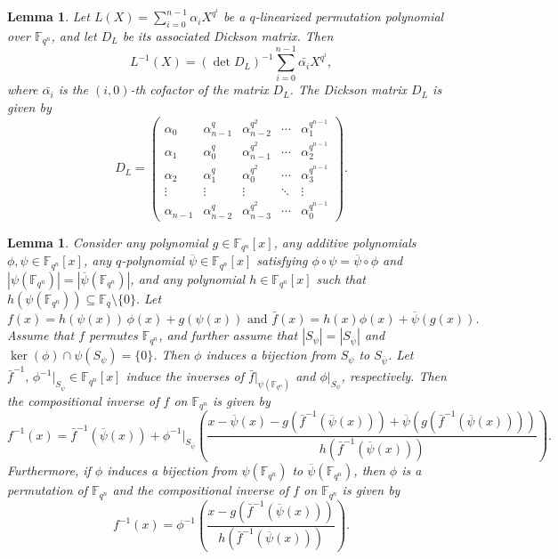 \documentclass[12pt]{amsart}
\newtheorem{lemma}[theorem]{Lemma}
\theoremstyle{definition}
\theoremstyle{remark}
\numberwithin{equation}{section}
\begin{document}
\begin{lemma}\cite{j1}\label{l2.6}
Let $L(X) = \sum_{i=0}^{n-1} \alpha_i X^{q^i}$ be a $q$-linearized permutation polynomial over $\mathbb{F}_{q^n}$, and let $D_L$ be its associated Dickson matrix. Then
$$
L^{-1}(X) = (\det D_L)^{-1} \sum_{i=0}^{n-1} \bar{\alpha_i} X^{q^i},
$$
where $\bar{\alpha_i}$ is the $(i,0)$-th cofactor of the matrix $D_L$. The Dickson matrix $D_L$ is given by
$$
D_L =
\begin{pmatrix}
\alpha_0 & \alpha_{n-1}^q & \alpha_{n-2}^{q^2} & \cdots & \alpha_1^{q^{n-1}} \\
\alpha_1 & \alpha_0^q     & \alpha_{n-1}^{q^2} & \cdots & \alpha_2^{q^{n-1}} \\
\alpha_2 & \alpha_1^q     & \alpha_0^{q^2}     & \cdots & \alpha_3^{q^{n-1}} \\
\vdots   & \vdots         & \vdots             & \ddots & \vdots \\
\alpha_{n-1} & \alpha_{n-2}^q & \alpha_{n-3}^{q^2} & \cdots & \alpha_0^{q^{n-1}}
\end{pmatrix}.
$$
\end{lemma}

\begin{lemma}\cite{j2}\label{l2.7}
Consider any polynomial $g \in \mathbb{F}_{q^n}[x]$, any additive polynomials $\phi,\psi \in \mathbb{F}_{q^n}[x]$, any $q$-polynomial $\overline{\psi} \in \mathbb{F}_{q^n}[x]$ satisfying $\phi \circ \psi = \overline{\psi} \circ \phi
$ and $|\psi(\mathbb{F}_{q^n})| = |\overline{\psi}(\mathbb{F}_{q^n})|$, and any polynomial $h \in \mathbb{F}_{q^n}[x]$ such that
$
h(\psi(\mathbb{F}_{q^n})) \subseteq \mathbb{F}_q \setminus \{0\}.
$
Let
$
f(x) = h(\psi(x))\,\phi(x) + g(\psi(x)) \text{ and } 
\bar{f}(x) = h(x)\phi(x) + \overline{\psi}(g(x)).
$ Assume that $f$ permutes $\mathbb{F}_{q^n}$, and further assume that $|S_{\psi}| = |S_{\overline{\psi}}|$ and
$\ker(\phi) \cap \psi(S_{\psi}) = \{0\}$. Then $\phi$ induces a bijection from $S_{\psi}$ to $S_{\overline{\psi}}$. Let $\bar{f}^{-1},\, \phi^{-1}\!\big|_{S_{\overline{\psi}}} \in \mathbb{F}_{q^n}[x]$ induce the inverses of $\bar{f}\!\big|_{\psi(\mathbb{F}_{q^n})}$ and $\phi\!\big|_{S_{\psi}}$, respectively. Then the compositional inverse of $f$ on $\mathbb{F}_{q^n}$ is given by
$$
f^{-1}(x)
=
\bar{f}^{-1}(\overline{\psi}(x))
+
\phi^{-1}\!\big|_{S_{\overline{\psi}}}
\left(
\frac{
x - \overline{\psi}(x) - g(\bar{f}^{-1}(\overline{\psi}(x))) + \overline{\psi}(g(\bar{f}^{-1}(\overline{\psi}(x))))
}
{h(\bar{f}^{-1}(\overline{\psi}(x)))}
\right).
$$
Furthermore, if $\phi$ induces a bijection from $\psi(\mathbb{F}_{q^n})$ to $\overline{\psi}(\mathbb{F}_{q^n})$, then $\phi$ is a permutation of $\mathbb{F}_{q^n}$ and the compositional inverse of $f$ on $\mathbb{F}_{q^n}$ is given by
$$
f^{-1}(x)
=
\phi^{-1}
\left(
\frac{
x - g(\bar{f}^{-1}(\overline{\psi}(x)))
}{
h(\bar{f}^{-1}(\overline{\psi}(x)))
}
\right).
$$
\end{lemma}
\end{document}
